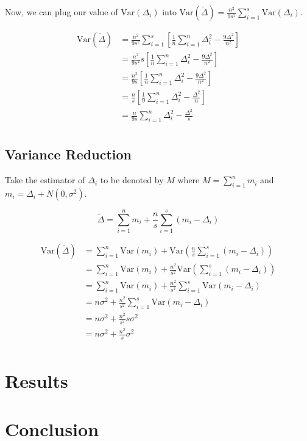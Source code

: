 \documentclass[11pt]{article}
\begin{document}
Now, we can plug our value of $\mathrm{Var}(\Delta_i)$ into $\mathrm{Var}(\tilde{\Delta}) = \frac{n^2}{9s^2} \sum_{i=1}^{s} \mathrm{Var}(\Delta_i)$.

\[
\begin{aligned}
\mathrm{Var}(\tilde{\Delta}) &= \frac{n^2}{9s^2} \sum_{i=1}^{s} [\frac{1}{n} \sum_{i = 1}^{n} \Delta_i^2 - \frac{9\Delta^2}{n^2}] \\
&= \frac{n^2}{9s^2} s [\frac{1}{n} \sum_{i = 1}^{n} \Delta_i^2 - \frac{9\Delta^2}{n^2}] \\
&= \frac{n^2}{9s} [\frac{1}{n} \sum_{i = 1}^{n} \Delta_i^2 - \frac{9\Delta^2}{n^2}] \\
&= \frac{n}{s} [\frac{1}{9}\sum_{i = 1}^{n} \Delta_i^2 - \frac{\Delta^2}{n}] \\
&= \frac{n}{9s} \sum_{i = 1}^{n} \Delta_i^2 - \frac{\Delta^2}{s} \\
\end{aligned}
\]

\subsection{Variance Reduction}

Take the estimator of $\Delta_i$ to be denoted by $M$ where $M = \sum_{i = 1}^{n} m_i$ and $m_i = \Delta_i + N(0, \sigma^2)$.

\[
\tilde{\Delta} = \sum_{i = 1}^{n} m_i + \frac{n}{s} \sum_{i = 1}^{s} (m_i - \Delta_i)
\]

\[
\begin{aligned}
\mathrm{Var}(\tilde{\Delta}) &= \sum_{i = 1}^{n} \mathrm{Var}(m_i) + \mathrm{Var}(\frac{n}{s} \sum_{i = 1}^{s} (m_i - \Delta_i)) \\
&= \sum_{i = 1}^{n} \mathrm{Var}(m_i) + \frac{n^2}{s^2} \mathrm{Var}(\sum_{i = 1}^{s} (m_i - \Delta_i)) \\
&= \sum_{i = 1}^{n} \mathrm{Var}(m_i) + \frac{n^2}{s^2} \sum_{i = 1}^{s} \mathrm{Var}(m_i - \Delta_i) \\
&= n \sigma^2 + \frac{n^2}{s^2} \sum_{i = 1}^{s} \mathrm{Var}(m_i - \Delta_i) \\
&= n \sigma^2 + \frac{n^2}{s^2} s \sigma^2 \\
&= n \sigma^2 + \frac{n^2}{s} \sigma^2 \\
\end{aligned}
\]

\newpage

\section{Results}

\newpage

\section{Conclusion}

\newpage



\end{document}
